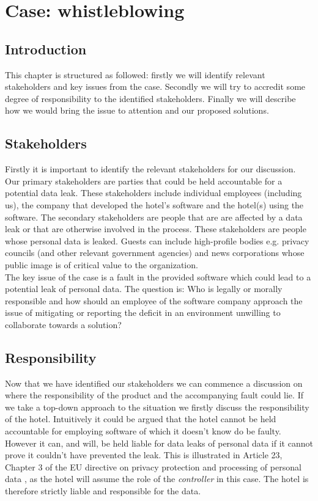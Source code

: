 \chapter{Case: whistleblowing}\label{ch:whistleblowing}
\section{Introduction}
This chapter is structured as followed: firstly we will identify relevant stakeholders and key issues from the case. Secondly we will try to accredit some degree of responsibility to the identified stakeholders. Finally we will describe how we would bring the issue to attention and our proposed solutions.

\section{Stakeholders}
Firstly it is important to identify the relevant stakeholders for our discussion. Our primary stakeholders are parties that could be held accountable for a potential data leak. These stakeholders include individual employees (including us), the company that developed the hotel's software and the hotel(s) using the software.  The secondary stakeholders are people that are are affected by a data leak or that are otherwise involved in the process. These stakeholders are people whose personal data is leaked. Guests can include high-profile bodies e.g. privacy councils (and other relevant government agencies) and news corporations whose public image is of critical value to the organization.\\
The key issue of the case is a fault in the provided software which could lead to a potential leak of personal data. The question is: Who is legally or morally responsible and how should an employee of the software company approach the issue of mitigating or reporting the deficit in an environment unwilling to collaborate towards a solution?

\section{Responsibility}
Now that we have identified our stakeholders we can commence a discussion on where the responsibility of the product and the accompanying fault could lie. If we take a top-down approach to the situation we firstly discuss the responsibility of the hotel. Intuitively it could be argued that the hotel cannot be held accountable for employing software of which it doesn't know do be faulty. However it can, and will, be held liable for data leaks of personal data if it cannot prove it couldn't have prevented the leak. This is illustrated in Article 23, Chapter 3 of the EU directive on privacy protection and processing of personal data \cite{privacy_directive}, as the hotel will assume the role of the \textit{controller} in this case. The hotel is therefore strictly liable and responsible for the data.

